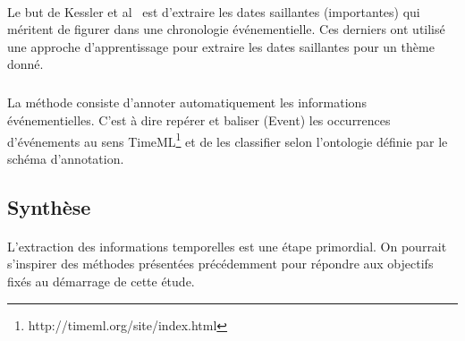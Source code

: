 \paragraph{}
Le but de Kessler et al~\cite{kessler2013} est d'extraire les dates saillantes (importantes) qui méritent de figurer dans une chronologie événementielle.
Ces derniers ont utilisé une approche d’apprentissage pour extraire les dates saillantes pour un thème donné.
\subparagraph{}
La méthode consiste d'annoter automatiquement les informations événementielles. 
C’est à dire repérer et baliser (Event) les occurrences d’événements au sens TimeML\footnote{http://timeml.org/site/index.html} et de les classifier selon l’ontologie définie par le schéma d’annotation. 
\subsection*{Synthèse}
\paragraph{}
L'extraction des informations temporelles est une étape primordial. On pourrait s'inspirer des méthodes présentées précédemment pour répondre aux objectifs fixés au démarrage de cette étude.

